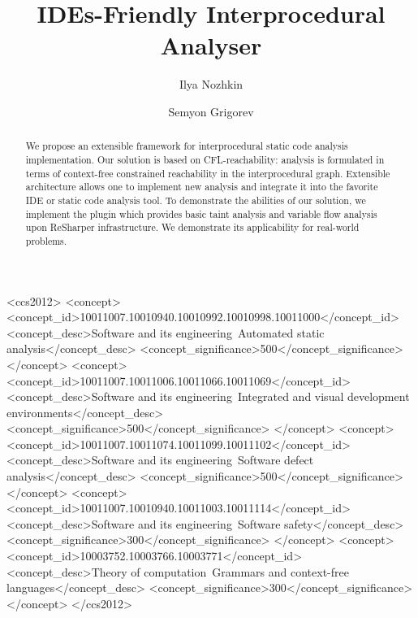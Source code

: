 \documentclass[sigconf]{acmart}
\begin{document}
\title[IDEs-Friendly Interprocedural Analyser]{IDEs-Friendly Interprocedural Analyser}

\author{Ilya Nozhkin}

\author{Semyon Grigorev}


\begin{abstract}
We propose an extensible framework for interprocedural static code analysis implementation.
Our solution is based on CFL-reachability: analysis is formulated in terms of context-free constrained reachability in the interprocedural graph.
Extensible architecture allows one to implement new analysis and integrate it into the favorite IDE or static code analysis tool.
To demonstrate the abilities of our solution, we implement the plugin which provides basic taint analysis and variable flow analysis upon ReSharper infrastructure.
We demonstrate its applicability for real-world problems.
\end{abstract}


\begin{CCSXML}
<ccs2012>
<concept>
<concept_id>10011007.10010940.10010992.10010998.10011000</concept_id>
<concept_desc>Software and its engineering~Automated static analysis</concept_desc>
<concept_significance>500</concept_significance>
</concept>
<concept>
<concept_id>10011007.10011006.10011066.10011069</concept_id>
<concept_desc>Software and its engineering~Integrated and visual development environments</concept_desc>
<concept_significance>500</concept_significance>
</concept>
<concept>
<concept_id>10011007.10011074.10011099.10011102</concept_id>
<concept_desc>Software and its engineering~Software defect analysis</concept_desc>
<concept_significance>500</concept_significance>
</concept>
<concept>
<concept_id>10011007.10010940.10011003.10011114</concept_id>
<concept_desc>Software and its engineering~Software safety</concept_desc>
<concept_significance>300</concept_significance>
</concept>
<concept>
<concept_id>10003752.10003766.10003771</concept_id>
<concept_desc>Theory of computation~Grammars and context-free languages</concept_desc>
<concept_significance>300</concept_significance>
</concept>
</ccs2012>
\end{CCSXML}
\end{document}
